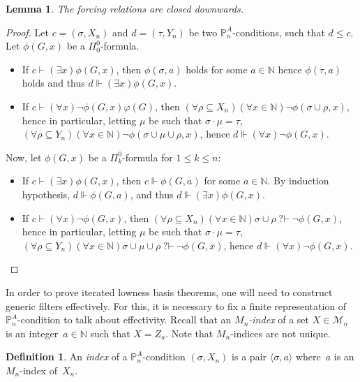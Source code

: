 \documentclass{article}
\def\NN{\mathbb{N}}
\def\PP{\mathbb{P}}
\def\M{\mathcal{M}}
\def\PP{\mathbb{P}}
\newcommand{\qvdash}{\operatorname{{?}{\vdash}}}
\numberwithin{theorem}{section}
\newtheorem{lemma}[theorem]{Lemma}
\theoremstyle{definition}
\newtheorem{definition}[theorem]{Definition}
\begin{document}
\begin{lemma}\label{lem:core-forcing-closure}
    The forcing relations are closed downwards.
\end{lemma}

\begin{proof}
    Let $c = ( \sigma,X_n)$ and $d = (\tau,Y_n)$ be two $\PP_n^A$-conditions, such that $d \leq c$.
Let $\phi(G, x)$ be a $\Pi^0_0$-formula.
    \begin{itemize}
        \item If $c \vdash (\exists x)\phi(G, x)$, then $\phi(\sigma,a)$ holds for some $a \in \NN$ hence $\phi(\tau,a)$ holds and thus $d \Vdash (\exists x)\phi(G, x)$.
        \item If $c \vdash (\forall x)\neg \phi(G, x)\varphi(G)$, then $(\forall \rho \subseteq X_n)(\forall x \in \NN)\neg \phi(\sigma \cup \rho,x)$, hence in particular, letting $\mu$ be such that $\sigma \cdot \mu = \tau$,  $(\forall \rho \subseteq Y_n)(\forall x \in \NN)\neg \phi(\sigma \cup \mu \cup \rho,x)$, hence $d \Vdash (\forall x)\neg \phi(G, x)$.
    \end{itemize}
Now, let $\phi(G, x)$ be a $\Pi^0_k$-formula for $1 \leq k \leq n$:
    \begin{itemize}
        \item If $c \vdash (\exists x)\phi(G, x)$, then $c \Vdash \phi(G,a)$ for some $a \in \NN$. By induction hypothesis, $d \Vdash \phi(G,a)$, and thus $d \Vdash (\exists x)\phi(G, x)$.
         \item If $c \vdash (\forall x)\neg \phi(G, x)$, then $(\forall \rho \subseteq X_n)(\forall x \in \NN)\sigma \cup \rho \qvdash \neg \phi(G,x)$, hence in particular, letting $\mu$ be such that $\sigma \cdot \mu = \tau$, $(\forall \rho \subseteq Y_n)(\forall x \in \NN) \sigma \cup \mu \cup \rho \qvdash \neg \phi(G,x)$, hence $d \Vdash (\forall x)\neg \phi(G, x)$.
    \end{itemize}
\end{proof}

In order to prove iterated lowness basis theorems, one will need to construct generic filters effectively. For this, it is necessary to fix a finite representation of $\PP^A_n$-condition to talk about effectivity.
Recall that an \emph{$M_n$-index} of a set $X \in \M_n$ is an integer~$a \in \NN$ such that $X = Z_a$. Note that $M_n$-indices are not unique.

\begin{definition}
An \emph{index} of a $\PP^A_n$-condition $(\sigma, X_n)$ is a pair $\langle \sigma, a\rangle$ where~$a$ is an $M_n$-index of~$X_n$.
\end{definition}
\end{document}

